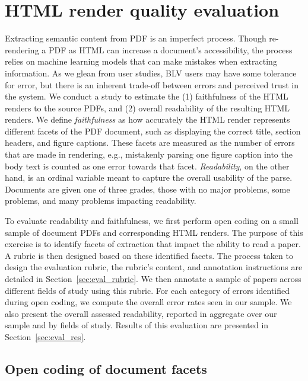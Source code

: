 \section{HTML render quality evaluation}
\label{sec:evaluation}

Extracting semantic content from PDF is an imperfect process. Though re-rendering a PDF as HTML can increase a document's accessibility, the process relies on machine learning models that can make mistakes when extracting information. As we glean from user studies, BLV users may have some tolerance for error, but there is an inherent trade-off between errors and perceived trust in the system. We conduct a study to estimate the (1) faithfulness of the HTML renders to the source PDFs, and (2) overall readability of the resulting HTML renders. We define \textit{faithfulness} as how accurately the HTML render represents different facets of the PDF document, such as displaying the correct title, section headers, and figure captions. These facets are measured as the number of errors that are made in rendering, e.g., mistakenly parsing one figure caption into the body text is counted as one error towards that facet. \textit{Readability}, on the other hand, is an ordinal variable meant to capture the overall usability of the parse. Documents are given one of three grades, those with no major problems, some problems, and many problems impacting readability.

To evaluate readability and faithfulness, we first perform open coding on a small sample of document PDFs and corresponding \scially HTML renders. The purpose of this exercise is to identify facets of extraction that impact the ability to read a paper. A rubric is then designed based on these identified facets. The process taken to design the evaluation rubric, the rubric's content, and annotation instructions are detailed in Section~\ref{sec:eval_rubric}. We then annotate a sample of \numeval papers across different fields of study using this rubric. For each category of errors identified during open coding, we compute the overall error rates seen in our sample. We also present the overall assessed readability, reported in aggregate over our sample and by fields of study. Results of this evaluation are presented in Section~\ref{sec:eval_res}.

\subsection{Open coding of document facets}
\label{sec:eval_coding}

